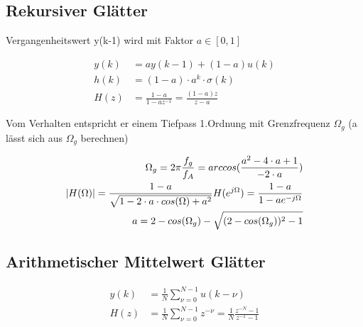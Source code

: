 \documentclass[10pt,a4paper]{article}
\begin{document}
\subsection{Rekursiver Glätter}
Vergangenheitswert y(k-1) wird mit Faktor $a\in [0,1]$
  \begin{mdframed}[style=exercise]
    \begin{align}
        y(k) &= ay(k-1)+(1-a)u(k) \\
        h(k) &= (1-a)\cdot a^{k} \cdot \sigma(k)\\
        H(z) &=\frac{1-a}{1-az^{-1}}=\frac{(1-a)z}{z-a}
    \end{align}
  \end{mdframed}
Vom Verhalten entspricht er einem Tiefpass 1.Ordnung mit Grenzfrequenz $\Omega_g$ (a lässt sich aus $\Omega_g$ berechnen)
  \begin{mdframed}[style=exercise]
    \begin{align}
        \Omega_g = 2\pi\frac{f_g}{f_A}= arccos(\frac{a^{2}-4\cdot a+1}{-2\cdot a})\\
        \abs{H(\Omega)}= \frac{1-a}{\sqrt{1-2\cdot a\cdot cos(\Omega)+a^{2}}}
        H(e^{j\Omega}) =\frac{1-a}{1-ae^{-j\Omega}}\\
        a = 2-cos(\Omega_g)-\sqrt{(2-cos(\Omega_g))^2-1}
    \end{align}
  \end{mdframed}
\subsection{Arithmetischer Mittelwert Glätter}
  \begin{mdframed}[style=exercise]
    \begin{align}
        y(k)&=\frac{1}{N}\sum_{\nu=0}^{N-1} u(k-\nu)\\
        H(z)&=\frac{1}{N}\sum_{\nu=0}^{N-1} z^{-\nu} = \frac{1}{N}\frac{z^{-N}-1}{z^{-1}-1}
    \end{align}
  \end{mdframed}
\end{document}
